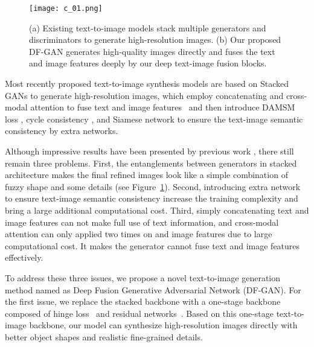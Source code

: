 \documentclass[10pt,twocolumn,letterpaper]{article}
\begin{document}
\begin{figure}[t] \small
  \centering
  \texttt{[image: c\_01.png]}
  \caption{(a) Existing text-to-image models stack multiple generators and discriminators to generate high-resolution images. (b) Our proposed DF-GAN generates high-quality images directly and fuses the text and image features deeply by our deep text-image fusion blocks.}
  \label{fig1}
  \vspace{-0.4cm}
\end{figure}

Most recently proposed text-to-image synthesis models are based on Stacked GANs \cite{zhang2017stackgan, zhang2018stackgan} to generate high-resolution images, which employ concatenating and cross-modal attention to fuse text and image features~\cite{reed2016generative, zhang2017stackgan, zhang2018stackgan, xu2018attngan, zhu2019dm} and then introduce DAMSM loss \cite{xu2018attngan}, cycle consistency \cite{qiao2019mirrorgan}, and Siamese network \cite{yin2019semantics} to ensure the text-image semantic consistency by extra networks.

Although impressive results have been presented by previous work \cite{li2019controllable, qiao2019learn, qiao2019mirrorgan, zhu2019dm, yin2019semantics, li2019object,gou2020segattngan}, there still remain three problems. 
First, the entanglements between generators in stacked architecture makes the final refined images look like a simple combination of fuzzy shape and some details (see Figure~\ref{fig1}).
Second, introducing extra network to ensure text-image semantic consistency increase the training complexity and bring a large additional computational cost.
Third, simply concatenating text and image features can not make full use of text information, and cross-modal attention can only applied two times on  and  image features due to large computational cost. It makes the generator cannot fuse text and image features effectively.

To address these three issues, we propose a novel text-to-image generation method named as Deep Fusion Generative Adversarial Network (DF-GAN). 
For the first issue, we replace the stacked backbone with a one-stage backbone composed of hinge loss~\cite{zhang2019self} and residual networks~\cite{he2016deep}.
Based on this one-stage text-to-image backbone, our model can synthesize high-resolution images directly with better object shapes and realistic fine-grained details.
\end{document}
